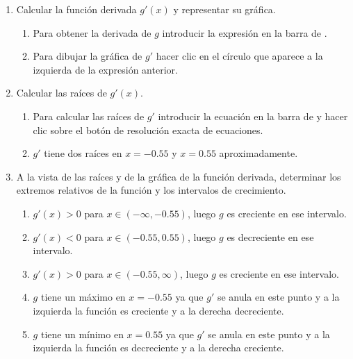 \begin{enumerate}[leftmargin=*]
\begin{enumerate}
      \item Calcular la función derivada $g'(x)$ y representar su gráfica.
            \begin{indication}
            \begin{enumerate}
            \item Para obtener la derivada de $g$ introducir la expresión  en la barra de .
            \item Para dibujar la gráfica de $g'$ hacer clic en el círculo que aparece a la izquierda de la expresión anterior.
            \end{enumerate}
            \end{indication}

      \item Calcular las raíces de $g'(x).$
            \begin{indication}
            \begin{enumerate}
            \item Para calcular las raíces de $g'$ introducir la ecuación  en la barra de  y hacer clic sobre el botón de resolución exacta de ecuaciones.
            \item $g'$ tiene dos raíces en $x=-0.55$ y $x=0.55$ aproximadamente.
            \end{enumerate}
            \end{indication}

      \item  A la vista de las raíces y de la gráfica de la función derivada, determinar los extremos relativos de la función y los intervalos de crecimiento.
            \begin{indication}
            \begin{enumerate}
            \item $g'(x)>0$ para $x\in (-\infty, -0.55)$, luego $g$ es creciente en ese intervalo.
            \item $g'(x)<0$ para $x\in (-0.55, 0.55)$, luego $g$ es decreciente en ese intervalo.
            \item $g'(x)>0$ para $x\in (-0.55, \infty)$, luego $g$ es creciente en ese intervalo.
            \item $g$ tiene un máximo en $x=-0.55$ ya que $g'$ se anula en este punto y a la izquierda la función es creciente y a la derecha decreciente.
            \item $g$ tiene un mínimo en $x=0.55$ ya que $g'$ se anula en este punto y a la izquierda la función es decreciente y a la derecha creciente.
            \end{enumerate}
            \end{indication}


\end{enumerate}
\end{enumerate}
